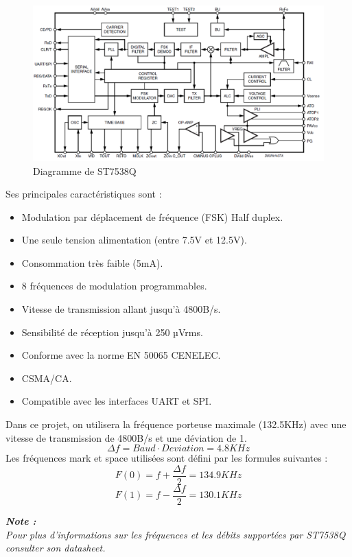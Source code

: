 \documentclass[11pt, a4paper, twoside]{book}
\begin{document}
\begin{figure}[h]
\centering
\includegraphics[width=\textwidth]{st7538Q}
\caption{Diagramme de ST7538Q}
\end{figure}
Ses principales caractéristiques sont :
\begin{itemize}
\item Modulation par déplacement de fréquence (FSK) Half duplex.
\item Une seule tension alimentation (entre 7.5V et 12.5V).
\item Consommation très faible (5mA).
\item 8 fréquences de modulation programmables.
\item Vitesse de transmission allant jusqu’à 4800B/s.
\item Sensibilité de réception jusqu’à 250 µVrms.
\item Conforme avec la norme EN 50065 CENELEC.
\item CSMA/CA\footnotemark.
\item Compatible avec les interfaces UART et SPI.
\end{itemize}

Dans ce projet, on utilisera la fréquence porteuse maximale (132.5KHz) avec une vitesse de transmission de 4800B/s et une déviation de 1.
\begin{equation}
\Delta f=Baud \cdot Deviation = 4.8 KHz
\end{equation}
Les fréquences mark et space utilisées sont défini par les formules suivantes :
\begin{equation}
F(0) = f + \dfrac{\Delta f}{2} = 134.9KHz
\end{equation}
\begin{equation}
F(1) = f - \dfrac{\Delta f}{2} = 130.1KHz
\end{equation}
\begin{center}
\textbf{\emph{Note :}}\\
\emph{Pour plus d'informations sur les fréquences et les débits supportées par ST7538Q consulter son datasheet.}
\end{center}
\end{document}
